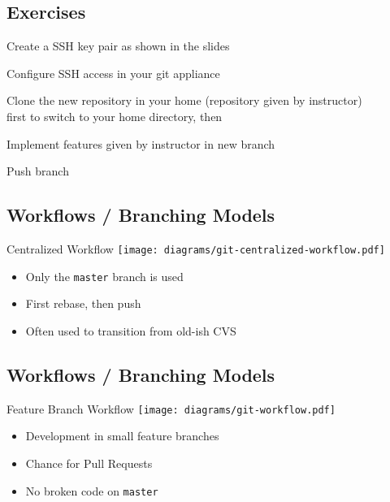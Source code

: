 \subsection{Exercises}
\begin{frame}[fragile]
  \subslidetitle
  \begin{exercise}
    \item Create a SSH key pair as shown in the slides
    \item Configure SSH access in your git appliance
    \item Clone the new repository in your home (repository given by instructor)\\
       first to switch to your home directory, then\\
    \item Implement features given by instructor in new branch
    \item Push branch
  \end{exercise}
\end{frame}

\subsection{Workflows / Branching Models}
\begin{frame}[fragile]
  \subslidetitle
  Centralized Workflow
  \center \texttt{[image: diagrams/git-centralized-workflow.pdf]}

  \vspace{2em}
  \begin{itemize}
    \item Only the \lstinline{master} branch is used
    \item First rebase, then push
    \item Often used to transition from old-ish CVS
  \end{itemize}
\end{frame}

\subsection{Workflows / Branching Models}
\begin{frame}[fragile]
  \subslidetitle
  Feature Branch Workflow
  \center \texttt{[image: diagrams/git-workflow.pdf]}

  \vspace{2em}
  \begin{itemize}
    \item Development in small feature branches
    \item Chance for Pull Requests
    \item No broken code on \lstinline{master}
  \end{itemize}
\end{frame}

